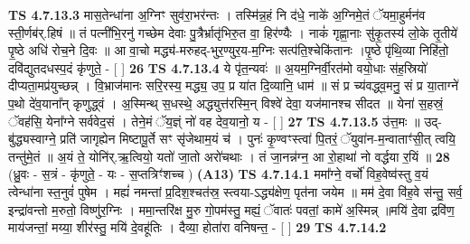 \documentclass[17pt]{extarticle}
\begin{document}
                                \textbf{ TS 4.7.13.3} \newline
                  मास॒तेन्धा॑ना अ॒ग्निꣳ सुव॑रा॒भर॑न्तः । तस्मि॑न्न॒हं नि द॑धे॒ नाके॑ अ॒ग्निमे॒तं ॅयमा॒हुर्मन॑व स्ती॒र्णब॑र्.हिषं ॥ तं पत्नी॑भि॒रनु॑ गच्छेम देवाः पु॒त्रैर्भ्रातृ॑भिरु॒त वा॒ हिर॑ण्यैः । नाकं॑ गृह्णा॒नाः सु॑कृ॒तस्य॑ लो॒के तृ॒तीये॑ पृ॒ष्ठे अधि॑ रोच॒ने दि॒वः ॥ आ वा॒चो मद्ध्य॑-मरुहद्-भुर॒ण्युर॒य-म॒ग्निः सत्प॑ति॒श्चेकि॑तानः ।पृ॒ष्ठे पृ॑थि॒व्या निहि॑तो॒ दवि॑द्युतदधस्प॒दं कृ॑णुते॒ - [  ] \textbf{  26} \newline
                  \newline
                                \textbf{ TS 4.7.13.4} \newline
                  ये पृ॑त॒न्यवः॑ ॥ अ॒यम॒ग्निर्वी॒रत॑मो वयो॒धाः स॑ह॒स्रियो॑ दीप्यता॒मप्र॑युच्छन्न् । वि॒भ्राज॑मानः सरि॒रस्य॒ मद्ध्य॒ उप॒ प्र या॑त दि॒व्यानि॒ धाम॑ ॥ सं प्र च्य॑वद्ध्व॒मनु॒ सं प्र या॒ताग्ने॑ प॒थो दे॑व॒याना᳚न् कृणुद्ध्वं । अ॒स्मिन्थ् स॒धस्थे॒ अद्ध्युत्त॑रस्मि॒न् विश्वे॑ देवा॒ यज॑मानश्च सीदत ॥ येना॑ स॒हस्रं॒ ॅवह॑सि॒ येना᳚ग्ने सर्ववेद॒सं । तेने॒मं ॅय॒ज्ञ्ं नो॑ वह देव॒यानो॒ य - [  ] \textbf{  27} \newline
                  \newline
                                \textbf{ TS 4.7.13.5} \newline
                  उ॑त्त॒मः ॥ उद्-बु॑द्ध्यस्वाग्ने॒ प्रति॑ जागृह्येन मिष्टापू॒र्ते सꣳ सृ॑जेथाम॒यं च॑ । पुनः॑ कृ॒ण्वꣳस्त्वा॑ पि॒तरं॒ ॅयुवा॑न-म॒न्वाताꣳ॑सी॒त् त्वयि॒ तन्तु॑मे॒तं ॥ अ॒यं ते॒ योनि॑र्.ऋ॒त्वियो॒ यतो॑ जा॒तो अरो॑चथाः । तं जा॒नन्न॑ग्न॒ आ रो॒हाथा॑ नो वर्द्धया र॒यिं ॥ \textbf{  28} \newline
                  \newline
                      (ध्रु॒वः - स॒त्रं - कृ॑णुते॒ - यः - स॒प्तत्रिꣳ॑शच्च )  \textbf{(A13)} \newline \newline
                                        \textbf{ TS 4.7.14.1} \newline
                  ममा᳚ग्ने॒ वर्चो॑ विह॒वेष्व॑स्तु व॒यं त्वेन्धा॑ना स्त॒नुवं॑ पुषेम । मह्यं॑ नमन्तां प्र॒दिश॒श्चत॑स्र॒ स्त्वया-ऽद्ध्य॑क्षेण॒ पृत॑ना जयेम ॥ मम॑ दे॒वा वि॑ह॒वे स॑न्तु॒ सर्व॒ इन्द्रा॑वन्तो म॒रुतो॒ विष्णु॑र॒ग्निः । ममा॒न्तरि॑क्ष मु॒रु गो॒पम॑स्तु॒ मह्यं॒ ॅवातः॑ पवतां॒ कामे॑ अ॒स्मिन्न् ॥मयि॑ दे॒वा द्रवि॑ण॒ माय॑जन्तां॒ मय्या॒ शीर॑स्तु॒ मयि॑ दे॒वहू॑तिः । दैव्या॒ होता॑रा वनिषन्त॒ - [  ] \textbf{  29} \newline
                  \newline
                                \textbf{ TS 4.7.14.2} \newline
\end{document}
